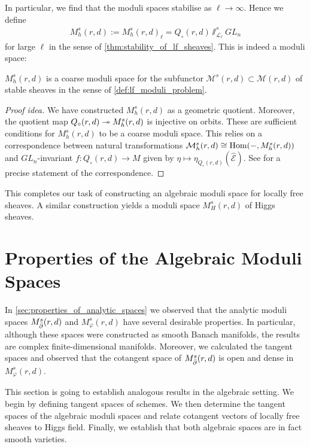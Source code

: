 \documentclass[12pt]{ociamthesis}  %
\begin{document}
In particular, we find that the moduli spaces stabilise as $\ell \to \infty$.
Hence we define
\begin{align}\label{eq:plain_algebraic_space}
  M^s_h(r,d) := M^s_h(r,d)_\ell = Q_\circ(r,d)\sslash^s_{\mathscr L_\ell} GL_n
\end{align}
for large $\ell$ in the sense of \ref{thm:stability_of_lf_sheaves}.
This is indeed a moduli space:

\begin{corollary}
  $M^s_h(r,d)$ is a coarse moduli space for the subfunctor
  $\mathcal M^s(r,d)\subset\mathcal M(r,d)$ of stable sheaves in
  the sense of \ref{def:lf_moduli_problem}.
  \begin{proof}[Proof idea]
    We have constructed $M^s_h(r,d)$ as a geometric quotient. Moreover,
    the quotient map $Q_\circ(r,d)\twoheadrightarrow M^s_h(r,d)$ is injective on
    orbits. These are sufficient conditions for $M^s_h(r,d)$
    to be a coarse moduli space. This relies on a correspondence between
    natural transformations $\mathcal M^s_h(r,d)\cong\operatorname{Hom}(-,M^s_h(r,d))$ and
    $GL_n$-invariant $f:Q_\circ(r,d)\to M$ given by
    $\eta\mapsto\eta_{Q_\circ(r,d)}(\hat{\mathscr E})$. See
    \cite[Proposition 3.35]{hoskins2016} for a precise statement
    of the correspondence.
  \end{proof}
\end{corollary}

This completes our task of constructing an algebraic moduli space
for locally free sheaves. A similar construction yields a moduli
space $M^s_H(r,d)$ of Higgs sheaves. 

\section{Properties of the Algebraic Moduli Spaces}

In \ref{sec:properties_of_analytic_spaces} we observed that the
analytic moduli spaces $M^s_{\bar{\partial}}(r,d)$ and $M^s_\varphi(r,d)$ have
several desirable properties. In particular, although
these spaces were constructed as smooth Banach manifolds, the results
are complex finite-dimensional manifolds. Moreover, we calculated
the tangent spaces and observed that the cotangent space of
$M^s_{\bar{\partial}}(r,d)$ is open and dense in $M^s_\varphi(r,d)$.

This section is going to establish analogous results in the algebraic
setting. We begin by defining tangent spaces of schemes. We then
determine the tangent spaces of the algebraic moduli spaces and
relate cotangent vectors of locally free sheaves to Higgs field. Finally,
we establish that both algebraic spaces are in fact smooth varieties.
\end{document}
